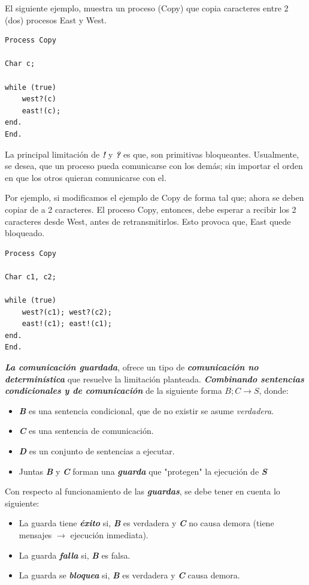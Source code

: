 \documentclass[a4paper, 10pt]{report}
\begin{document}
El siguiente ejemplo, muestra un proceso (Copy) que copia caracteres entre 2 (dos) procesos East y West.

\begin{lstlisting}
Process Copy

Char c;

while (true)
	west?(c)
	east!(c);
end.
End.
\end{lstlisting}

La principal limitación de \textbf{\emph{!}} y \textbf{\emph{?}} es que, son primitivas bloqueantes. Usualmente, se desea, que un proceso pueda comunicarse con los demás; sin importar el orden en que los otros quieran comunicarse con el.

Por ejemplo, si modificamos el ejemplo de Copy de forma tal que; ahora se deben copiar de a 2 caracteres. El proceso Copy, entonces, debe esperar a recibir los 2 caracteres desde West, antes de retransmitirlos. Esto provoca que, East quede bloqueado.

\begin{lstlisting}
Process Copy

Char c1, c2;

while (true)
	west?(c1); west?(c2);
	east!(c1); east!(c1);
end.
End.
\end{lstlisting}

\textbf{\emph{La comunicación guardada}}, ofrece un tipo de \textbf{\emph{comunicación no determinística}} que resuelve la limitación planteada. \textbf{\emph{Combinando sentencias condicionales y de comunicación}} de la siguiente forma $B; C \rightarrow S $, donde:

\begin{itemize}
	\item \textbf{\emph{B}} es una sentencia condicional, que de no existir se asume \emph{verdadera}.
	\item \textbf{\emph{C}} es una sentencia de comunicación.
	\item \textbf{\emph{D}} es un conjunto de sentencias a ejecutar.
	\item Juntas \textbf{\emph{B}} y \textbf{\emph{C}} forman una \textbf{\emph{guarda}} que "protegen" la ejecución de \textbf{\emph{S}}
\end{itemize}

Con respecto al funcionamiento de las \textbf{\emph{guardas}}, se debe tener en cuenta lo siguiente:

\begin{itemize}
	\item La guarda tiene \textbf{\emph{éxito}} si, \textbf{\emph{B}} es verdadera y \textbf{\emph{C}} no causa demora (tiene mensajes $\rightarrow$ ejecución inmediata).
	\item La guarda \textbf{\emph{falla}} si, \textbf{\emph{B}} es falsa.
	\item La guarda se \textbf{\emph{bloquea}} si, \textbf{\emph{B}} es verdadera y \textbf{\emph{C}} causa demora.
\end{itemize}
\end{document}
